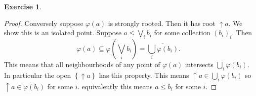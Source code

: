 \documentclass{article}
\newcommand{\set}[1]{\left\{#1\right\}}
\theoremstyle{definition}
\newtheorem{question}{Exercise}
\begin{document}
\begin{question}
\begin{enumerate}[(a)]
\begin{proof}
                  Conversely suppose \(\varphi(a)\) is strongly rooted. Then it
                  has root \(\uparrow a\). We show this is an isolated point.
                  Suppose \(a\leq\bigvee_{i}b_{i}\) for some collection
                  \((b_{i})_{i}\). Then
                  \[
                      \varphi(a)\subseteq\varphi(\bigvee_{i}b_{i})=\overline{\bigcup_{i}\varphi(b_{i})}.
                  \]
                  This means that all neighbourhoods of any point of
                  \(\varphi(a)\) intersects \(\bigcup_{i}\varphi(b_{i})\). In
                  particular the open \(\set{\uparrow a}\) has this property.
                  This means \(\uparrow a\in\bigcup_{i}\varphi(b_{i})\) so
                  \(\uparrow a\in\varphi(b_{i})\) for some \(i\). equivalently
                  this means \(a\leq b_{i}\) for some \(i\).
              \end{proof}
    \end{enumerate}
\end{question}
\end{document}
